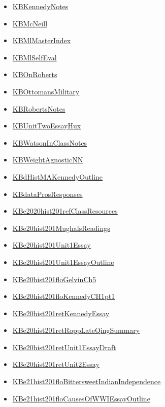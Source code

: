 \documentclass[11pt]{article}
\begin{document}
\begin{itemize}
\begin{itemize}
\item \href{hist201/KBKennedyNotes.org}{KBKennedyNotes}
\item \href{hist201/KBMcNeill.org}{KBMcNeill}
\item \href{hist201/KBMlMasterIndex.org}{KBMlMasterIndex}
\item \href{hist201/KBMlSelfEval.org}{KBMlSelfEval}
\item \href{hist201/KBOnRoberts.org}{KBOnRoberts}
\item \href{hist201/KBOttomansMilitary.org}{KBOttomansMilitary}
\item \href{hist201/KBRobertsNotes.org}{KBRobertsNotes}
\item \href{hist201/KBUnitTwoEssayHux.org}{KBUnitTwoEssayHux}
\item \href{hist201/KBWatsonInClassNotes.org}{KBWatsonInClassNotes}
\item \href{hist201/KBWeightAgnosticNN.org}{KBWeightAgnosticNN}
\item \href{hist201/KBdHistMAKennedyOutline.org}{KBdHistMAKennedyOutline}
\item \href{hist201/KBdataProsResponses.org}{KBdataProsResponses}
\item \href{hist201/KBe2020hist201refClassResources.org}{KBe2020hist201refClassResources}
\item \href{hist201/KBe20hist201MughalsReadings.org}{KBe20hist201MughalsReadings}
\item \href{hist201/KBe20hist201Unit1Essay.org}{KBe20hist201Unit1Essay}
\item \href{hist201/KBe20hist201Unit1EssayOutline.org}{KBe20hist201Unit1EssayOutline}
\item \href{hist201/KBe20hist201floGelvinCh5.org}{KBe20hist201floGelvinCh5}
\item \href{hist201/KBe20hist201floKennedyCH1pt1.org}{KBe20hist201floKennedyCH1pt1}
\item \href{hist201/KBe20hist201retKennedyEssay.org}{KBe20hist201retKennedyEssay}
\item \href{hist201/KBe20hist201retRoppLateQingSummary.org}{KBe20hist201retRoppLateQingSummary}
\item \href{hist201/KBe20hist201retUnit1EssayDraft.org}{KBe20hist201retUnit1EssayDraft}
\item \href{hist201/KBe20hist201retUnit2Essay.org}{KBe20hist201retUnit2Essay}
\item \href{hist201/KBe21hist201floBittersweetIndianIndependence.org}{KBe21hist201floBittersweetIndianIndependence}
\item \href{hist201/KBe21hist201floCausesOfWWIEssayOutline.org}{KBe21hist201floCausesOfWWIEssayOutline}

\end{itemize}
\end{itemize}
\end{document}
